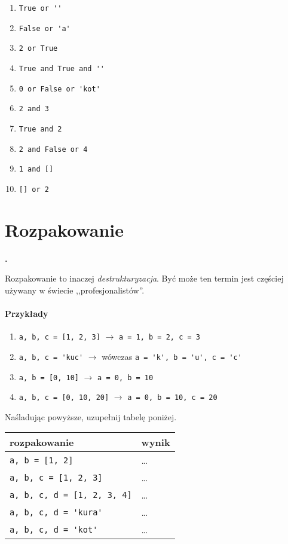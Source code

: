 \documentclass[a4paper]{article}
\begin{document}
\begin{multicols}{2}
\begin{enumerate}[label=\arabic*.]
    \item \verb|True or ''|
    \item \verb|False or 'a'|
    \item \verb|2 or True|
    \item \verb|True and True and ''|
    \item \verb|0 or False or 'kot'|
    \item \verb|2 and 3|
    \item \verb|True and 2|
    \item \verb|2 and False or 4|
    \item \verb|1 and []|
    \item \verb|[] or 2|

\end{enumerate}

\end{multicols}

\section{Rozpakowanie}

\textbf{.}\addtocounter{zadanie}{1} Rozpakowanie to inaczej \emph{destrukturyzacja}. Być może ten termin jest częściej używany w świecie ,,profesjonalistów''.

\paragraph{Przykłady}

\begin{enumerate}[]
    \item \verb|a, b, c = [1, 2, 3]| $\rightarrow$ \verb|a = 1, b = 2, c = 3|
    \item \verb|a, b, c = 'kuc'| $\rightarrow$ wówczas \verb|a = 'k', b = 'u', c = 'c'|
    \item \verb|a, b = [0, 10]| $\rightarrow$  \verb|a = 0, b = 10|
    \item \verb|a, b, c = [0, 10, 20]| $\rightarrow$  \verb|a = 0, b = 10, c = 20|
\end{enumerate}

Naśladując powyższe, uzupełnij tabelę poniżej.

\begin{tabular}{p{}|p{}}
\textsf{rozpakowanie} & \textsf{wynik} \\\hline
\verb|a, b = [1, 2]| & \dots \\
\verb|a, b, c = [1, 2, 3]| & \dots \\
\verb|a, b, c, d = [1, 2, 3, 4]| & \dots \\
\verb|a, b, c, d = 'kura'| & \dots \\
\verb|a, b, c, d = 'kot'| & \dots \\
\end{tabular}
\end{document}
